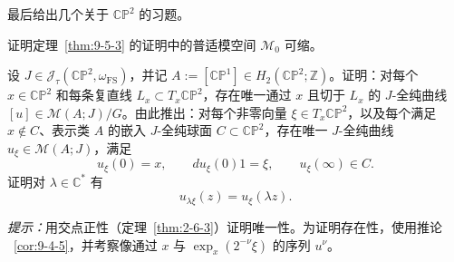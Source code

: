 最后给出几个关于 $\mathbb{CP}^2$ 的习题。

\begin{exercise}\label{ex:9-5-7}
证明定理~\ref{thm:9-5-3} 的证明中的普适模空间 $\mathcal M_0$ 可缩。
\end{exercise}

\begin{exercise}\label{ex:9-5-8}
设 $J\in\mathcal J_\tau(\mathbb{CP}^2,\omega_{\mathrm{FS}})$，并记
$A:=[\mathbb{CP}^1]\in H_2(\mathbb{CP}^2;\mathbb Z)$。证明：对每个
$x\in\mathbb{CP}^2$ 和每条复直线 $L_x\subset T_x\mathbb{CP}^2$，存在唯一通过 $x$
且切于 $L_x$ 的 $J$-全纯曲线
$[u]\in\mathcal M(A;J)/G$。由此推出：对每个非零向量
$\xi\in T_x\mathbb{CP}^2$，以及每个满足 $x\notin C$、表示类 $A$ 的嵌入 $J$-全纯球面
$C\subset\mathbb{CP}^2$，存在唯一 $J$-全纯曲线
$u_\xi\in\mathcal M(A;J)$，满足
\[
  u_\xi(0)=x,
  \qquad du_\xi(0)1=\xi,
  \qquad u_\xi(\infty)\in C.
\]
证明对 $\lambda\in\mathbb C^*$ 有
\[
  u_{\lambda\xi}(z)=u_\xi(\lambda z).
\]

\emph{提示：}用交点正性（定理~\ref{thm:2-6-3}）证明唯一性。为证明存在性，使用推论
~\ref{cor:9-4-5}，并考察像通过 $x$ 与
$\exp_x(2^{-\nu}\xi)$ 的序列 $u^\nu$。
\end{exercise}

